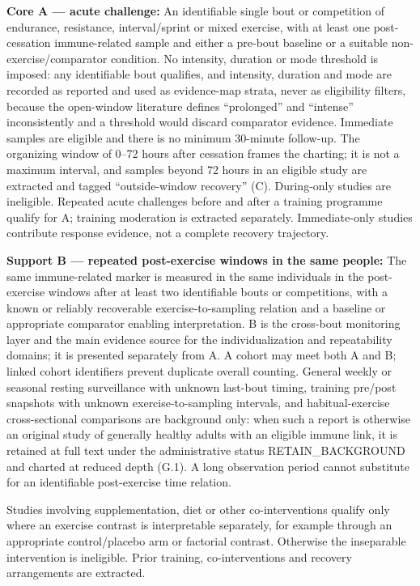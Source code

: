 \documentclass[
  11pt,
  a4paper,
]{article}
\begin{document}
\textbf{Core A --- acute challenge:} An identifiable single bout or
competition of endurance, resistance, interval/sprint or mixed exercise,
with at least one post-cessation immune-related sample and either a
pre-bout baseline or a suitable non-exercise/comparator condition. No
intensity, duration or mode threshold is imposed: any identifiable bout
qualifies, and intensity, duration and mode are recorded as reported and
used as evidence-map strata, never as eligibility filters, because the
open-window literature defines ``prolonged'' and ``intense''
inconsistently and a threshold would discard comparator evidence.
Immediate samples are eligible and there is no minimum 30-minute
follow-up. The organizing window of 0--72 hours after cessation frames
the charting; it is not a maximum interval, and samples beyond 72 hours
in an eligible study are extracted and tagged ``outside-window
recovery'' (C). During-only studies are ineligible. Repeated acute
challenges before and after a training programme qualify for A; training
moderation is extracted separately. Immediate-only studies contribute
response evidence, not a complete recovery trajectory.

\textbf{Support B --- repeated post-exercise windows in the same
people:} The same immune-related marker is measured in the same
individuals in the post-exercise windows after at least two identifiable
bouts or competitions, with a known or reliably recoverable
exercise-to-sampling relation and a baseline or appropriate comparator
enabling interpretation. B is the cross-bout monitoring layer and the
main evidence source for the individualization and repeatability
domains; it is presented separately from A. A cohort may meet both A and
B; linked cohort identifiers prevent duplicate overall counting. General
weekly or seasonal resting surveillance with unknown last-bout timing,
training pre/post snapshots with unknown exercise-to-sampling intervals,
and habitual-exercise cross-sectional comparisons are background only:
when such a report is otherwise an original study of generally healthy
adults with an eligible immune link, it is retained at full text under
the administrative status RETAIN\_BACKGROUND and charted at reduced
depth (G.1). A long observation period cannot substitute for an
identifiable post-exercise time relation.

Studies involving supplementation, diet or other co-interventions
qualify only where an exercise contrast is interpretable separately, for
example through an appropriate control/placebo arm or factorial
contrast. Otherwise the inseparable intervention is ineligible. Prior
training, co-interventions and recovery arrangements are extracted.
\end{document}
